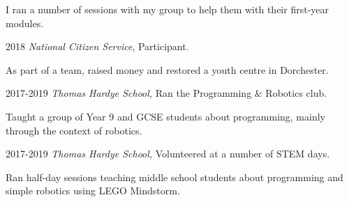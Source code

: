 \documentclass[12pt]{article}
\begin{document}
\begin{explist}
{\begin{explist}
		\item I ran a number of sessions with my group to help them with their first-year modules.
	\end{explist}}
	\item[2018] \textit{National Citizen Service}, Participant.
	{\small \begin{explist}
		\item As part of a team, raised money and restored a youth centre in Dorchester.
	\end{explist}}
	\item[2017-2019] \textit{Thomas Hardye School,} Ran the Programming \& Robotics club.
	{\small \begin{explist}
		\item Taught a group of Year 9 and GCSE students about programming, mainly through the context of robotics.
	\end{explist}}
	\item[2017-2019] \textit{Thomas Hardye School,} Volunteered at a number of STEM days.
	{\small \begin{explist}
		\item Ran half-day sessions teaching middle school students about programming and simple robotics using LEGO Mindstorm.
	\end{explist}}
\end{explist}
\end{document}
